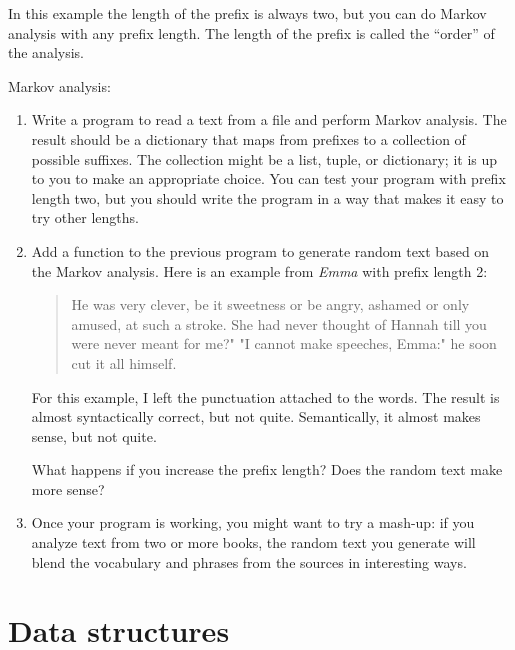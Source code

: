 \documentclass[10pt]{book}
\begin{document}
{In this example the length of the prefix is always two, but
you can do Markov analysis with any prefix length.  The length
of the prefix is called the ``order'' of the analysis.

\begin{ex}
Markov analysis:

\begin{enumerate}

\item Write a program to read a text from a file and perform Markov
analysis.  The result should be a dictionary that maps from
prefixes to a collection of possible suffixes.  The collection
might be a list, tuple, or dictionary; it is up to you to make
an appropriate choice.  You can test your program with prefix
length two, but you should write the program in a way that makes
it easy to try other lengths.

\item Add a function to the previous program to generate random text
based on the Markov analysis.  Here is an example from {\em Emma}
with prefix length 2:

\begin{quote}
He was very clever, be it sweetness or be angry, ashamed or only
amused, at such a stroke. She had never thought of Hannah till you
were never meant for me?" "I cannot make speeches, Emma:" he soon cut
it all himself.
\end{quote}

For this example, I left the punctuation attached to the words.
The result is almost syntactically correct, but not quite.
Semantically, it almost makes sense, but not quite.

What happens if you increase the prefix length?  Does the random
text make more sense?


\item Once your program is working, you might want to try a mash-up:
if you analyze text from two or more books, the random
text you generate will blend the vocabulary and phrases from
the sources in interesting ways.

\end{enumerate}
\end{ex}


\section{Data structures}


}
\end{document}
